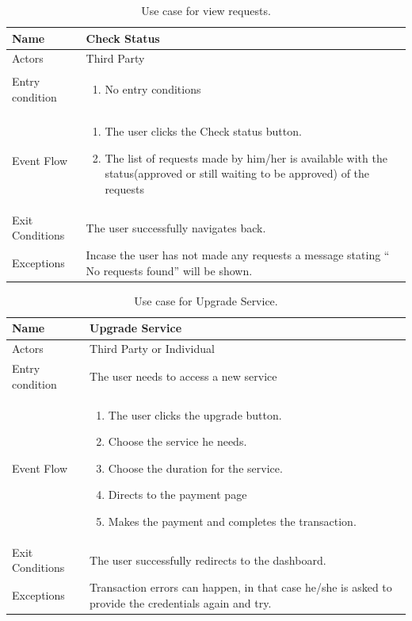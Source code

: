 
\begin{table}[H]
\begin{tabular}{| l | p{} |}
\hline
Name & Check Status\\
\hline
Actors & Third Party\\
\hline
Entry condition & \begin{enumerate}
\item No entry conditions
\end{enumerate}\\
\hline
Event Flow & \begin{enumerate}
\item The user clicks the Check status button.
\item The list of requests made by him/her is available with the status(approved or still waiting to be approved) of the requests
\end{enumerate}\\
\hline
Exit Conditions & The user successfully navigates back.\\
\hline
Exceptions & Incase the user has not made any requests a message stating “ No requests found” will be shown.\\
\hline
\end{tabular}
\caption{Use case for view requests.}
\label{usecase-view-requests}
\end{table}

\begin{table}[H]
\begin{tabular}{| l | p{} |}
\hline
Name & Upgrade Service\\
\hline
Actors & Third Party or Individual\\
\hline
Entry condition & The user needs to access a new service\\
\hline
Event Flow & \begin{enumerate}
\item The user clicks the upgrade button.
\item Choose the service he needs.
\item Choose the duration for the service.
\item Directs to the payment page
\item Makes the payment and completes the transaction.
\end{enumerate}
\\
\hline
Exit Conditions & The user successfully redirects to the dashboard.\\
\hline
Exceptions & Transaction errors can happen, in that case he/she is asked to provide the credentials again and try. \\
\hline
\end{tabular}
\caption{Use case for Upgrade Service.}
\label{usecase-upgradeservice}
\end{table}

